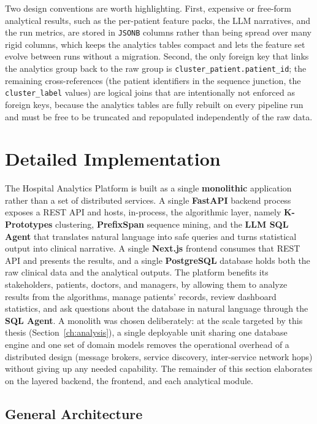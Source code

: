 Two design conventions are worth highlighting. First, expensive or free-form analytical results, such as the per-patient feature packs, the LLM narratives, and the run metrics, are stored in \texttt{JSONB} columns rather than being spread over many rigid columns, which keeps the analytics tables compact and lets the feature set evolve between runs without a migration. Second, the only foreign key that links the analytics group back to the raw group is \texttt{cluster\_patient.patient\_id}; the remaining cross-references (the patient identifiers in the sequence junction, the \texttt{cluster\_label} values) are logical joins that are intentionally not enforced as foreign keys, because the analytics tables are fully rebuilt on every pipeline run and must be free to be truncated and repopulated independently of the raw data.

\section{Detailed Implementation}

The Hospital Analytics Platform is built as a single \textbf{monolithic} application rather than a set of distributed services. A single \textbf{FastAPI} backend process exposes a REST API and hosts, in-process, the algorithmic layer, namely \textbf{K-Prototypes} clustering, \textbf{PrefixSpan} sequence mining, and the \textbf{LLM SQL Agent} that translates natural language into safe queries and turns statistical output into clinical narrative. A single \textbf{Next.js} frontend consumes that REST API and presents the results, and a single \textbf{PostgreSQL} database holds both the raw clinical data and the analytical outputs. The platform benefits its stakeholders, patients, doctors, and managers, by allowing them to analyze results from the algorithms, manage patients' records, review dashboard statistics, and ask questions about the database in natural language through the \textbf{SQL Agent}. A monolith was chosen deliberately: at the scale targeted by this thesis (Section~\ref{ch:analysis}), a single deployable unit sharing one database engine and one set of domain models removes the operational overhead of a distributed design (message brokers, service discovery, inter-service network hops) without giving up any needed capability. The remainder of this section elaborates on the layered backend, the frontend, and each analytical module.

\subsection{General Architecture}

